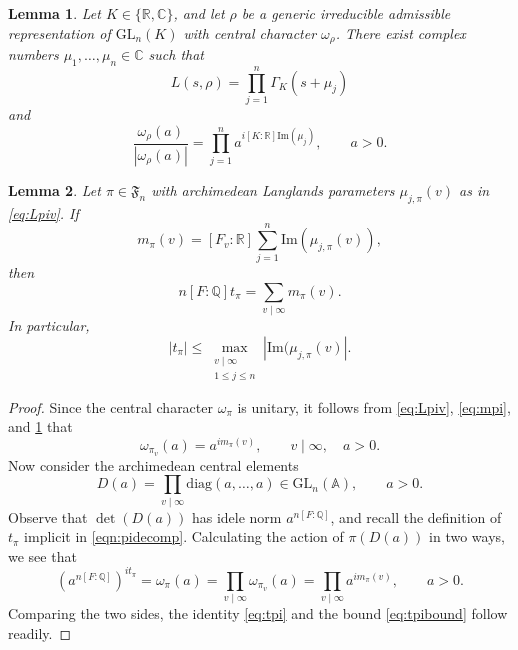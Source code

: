 \documentclass[10pt,a4paper]{amsart}
\newtheorem{lemma}{Lemma}
\newcommand{\A}{\mathbb{A}}
\newcommand{\CC}{\mathbb{C}}
\newcommand{\GL}{\mathrm{GL}}
\renewcommand{\Im}{\mathrm{Im}}
\newcommand{\Q}{\mathbb{Q}}
\newcommand{\R}{\mathbb{R}}
\newcommand{\diag}{\mathrm{diag}}
\begin{document}
\begin{lemma}\label{lem:rhochar}
Let $K\in\{\R,\CC\}$, and let $\rho$ be a generic irreducible admissible representation of $\GL_n(K)$ with central character $\omega_\rho$. There exist complex numbers $\mu_1,\dotsc,\mu_n\in\CC$ such that
\begin{equation}\label{eq:Lrho}
L(s,\rho)=\prod_{j=1}^n\Gamma_K(s+\mu_j)
\end{equation}
and
\begin{equation}\label{eq:wrho}
\frac{\omega_\rho(a)}{|\omega_\rho(a)|}=\prod_{j=1}^n a^{i[K:\R]\Im(\mu_j)},\qquad a>0.
\end{equation}
\end{lemma}

\begin{lemma}
\label{tpiformula}
Let $\pi\in\mathfrak{F}_n$ with archimedean Langlands parameters $\mu_{j,\pi}(v)$ as in \eqref{eq:Lpiv}.  If
\begin{equation}\label{eq:mpi}
m_{\pi}(v)=[F_v:\R]\sum_{j=1}^n \Im(\mu_{j,\pi}(v)),
\end{equation}
then
\begin{equation}\label{eq:tpi}
n[F:\Q]t_\pi=\sum_{v\mid\infty}m_{\pi}(v).
\end{equation}
In particular,
\begin{equation}\label{eq:tpibound}
|t_\pi|\leq\max_{\substack{v\mid\infty\\1\leq j\leq n}}|\Im(\mu_{j,\pi}(v)|.
\end{equation}
\end{lemma}

\begin{proof}
Since the central character $\omega_\pi$ is unitary, it follows from \eqref{eq:Lpiv}, \eqref{eq:mpi}, and \cref{lem:rhochar} that
\[
\omega_{\pi_v}(a)=a^{im_{\pi}(v)},\qquad v\mid\infty,\quad a>0.
\]
Now consider the archimedean central elements
\[
D(a)=\prod_{v\mid\infty}\diag(a,\dotsc,a)\in\GL_n(\A),\qquad a>0.
\]
Observe that $\det(D(a))$ has idele norm $a^{n[F:\Q]}$, and recall the definition of $t_\pi$ implicit in \eqref{eqn:pidecomp}. Calculating the action of $\pi(D(a))$ in two ways, we see that
\[
(a^{n[F:\Q]})^{it_\pi}=\omega_\pi(a)=\prod_{v\mid\infty}\omega_{\pi_v}(a)=\prod_{v\mid\infty}a^{im_{\pi}(v)},\qquad a>0.
\]
Comparing the two sides, the identity \eqref{eq:tpi} and the bound \eqref{eq:tpibound} follow readily.
\end{proof}
\end{document}
